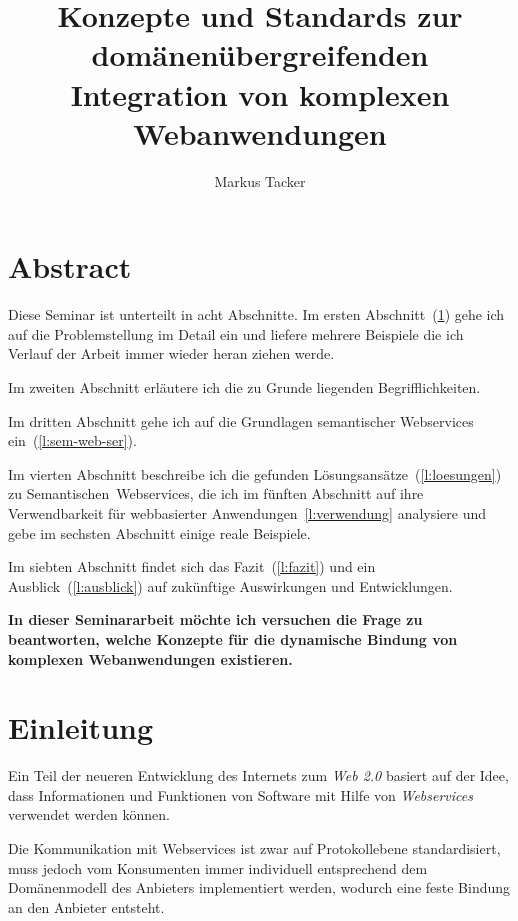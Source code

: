 \documentclass[10pt,a4paper]{article}
\begin{document}
\author{Markus Tacker}
\title{Konzepte und Standards zur domänenübergreifenden Integration von komplexen Webanwendungen}
\maketitle

\section*{Abstract}

Diese Seminar ist unterteilt in acht Abschnitte. Im ersten Abschnitt~(\ref{l:einleitung}) gehe ich auf die Problemstellung im Detail ein und liefere mehrere Beispiele die ich Verlauf der Arbeit immer wieder heran ziehen werde. 

Im zweiten Abschnitt erläutere ich die zu Grunde liegenden Begrifflichkeiten. 

Im dritten Abschnitt gehe ich auf die Grundlagen semantischer Webservices ein~(\ref{l:sem-web-ser}).

Im vierten Abschnitt beschreibe ich die gefunden Lösungsansätze~(\ref{l:loesungen}) zu Semantischen~Webservices, die ich im fünften Abschnitt auf ihre Verwendbarkeit für webbasierter Anwendungen~\ref{l:verwendung} analysiere und gebe im sechsten Abschnitt einige reale Beispiele.

Im siebten Abschnitt findet sich das Fazit~(\ref{l:fazit}) und ein Ausblick~(\ref{l:ausblick}) auf zukünftige Auswirkungen und Entwicklungen.

\textbf{In dieser Seminararbeit möchte ich versuchen die Frage zu beantworten, welche Konzepte für die dynamische Bindung von komplexen Webanwendungen existieren.}


\pagebreak

\tableofcontents

\section{Einleitung}
\label{l:einleitung}

Ein Teil der neueren Entwicklung des Internets zum \emph{Web 2.0} basiert auf der Idee, dass Informationen und Funktionen von Software mit Hilfe von \emph{Webservices} verwendet werden können. \cite{hn-web20}

Die Kommunikation mit Webservices ist zwar auf Protokollebene standardisiert, muss jedoch vom Konsumenten immer individuell entsprechend dem Domänenmodell des Anbieters implementiert werden, wodurch eine feste Bindung an den Anbieter entsteht.
\end{document}
